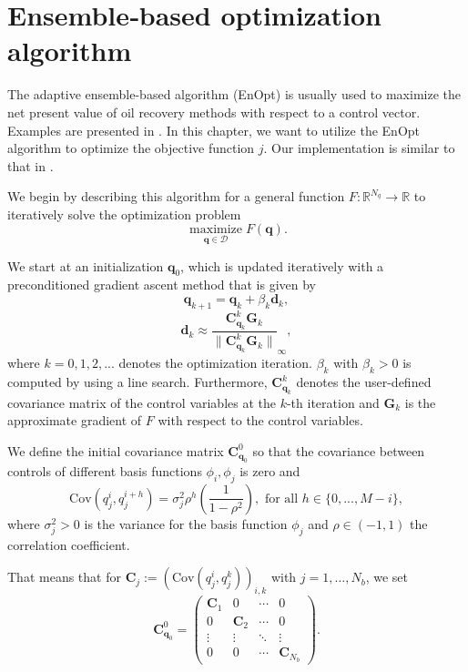 \chapter{ Ensemble‑based optimization algorithm}

The adaptive ensemble-based algorithm (EnOpt) is usually used to maximize the net present value of oil recovery methods with respect to a control vector. Examples are presented in \cite{Keil2022-dj, OGUNTOLA2021109165, Zhang2023-sg}. In this chapter, we want to utilize the EnOpt algorithm to optimize the objective function $j$. Our implementation is similar to that in \cite{Keil2022-dj}.

We begin by describing this algorithm for a general function $F:\mathbb{R}^{N_q}\to \mathbb{R}$ to iteratively solve the optimization problem
\begin{displaymath}
\operatorname*{maximize}_{\mathbf{q}\in\mathcal{D}}F(\mathbf{q}).
\end{displaymath}

We start at an initialization $\mathbf{q}_0$,  which is updated iteratively with a preconditioned gradient ascent method that is given by
\begin{displaymath}
\mathbf{q}_{k+1} = \mathbf{q}_k+\beta_k\mathbf{d}_k,
\end{displaymath}
\begin{displaymath}
\mathbf{d}_k\approx\frac{\mathbf{C}_{\mathbf{q}_k}^k\mathbf{G}_k}{\|\mathbf{C}_{\mathbf{q}_k}^k\mathbf{G}_k\|}_\infty,
\end{displaymath}
where $k=0,1,2,...$ denotes the optimization iteration. $\beta_k$ with $\beta_k>0$ is computed by using a line search. Furthermore, $\mathbf{C}_{\mathbf{q}_k}^k$ denotes the user-defined covariance matrix of the control variables at the $k$-th iteration and $\mathbf{G}_k$ is the approximate gradient of $F$ with respect to the control variables.

We define the initial covariance matrix $\mathbf{C}_{\mathbf{q}_0}^0$ so that the covariance between controls of different basis functions $\phi_i,\phi_j$ is zero and
\begin{displaymath}
\mathrm{Cov}(q_j^i,q_j^{i+h})=\sigma_j^2\rho^h\left(\frac{1}{1-\rho^2}\right),\text{ for all }h\in\{0,...,M-i\},
\end{displaymath}
where $\sigma_j^2>0$ is the variance for the basis function $\phi_j$ and $\rho\in(-1,1)$ the correlation coefficient.

That means that for $\mathbf{C}_j:=\left(\mathrm{Cov}(q_j^i,q_j^{k})\right)_{i,k}$ with $j=1,\dotsc,N_b$, we set
\begin{equation}
\label{initCov}
\mathbf{C}_{\mathbf{q}_0}^0 =
\begin{pmatrix}
  \mathbf{C}_1 & 0 & \cdots & 0 \\
  0 & \mathbf{C}_2 & \cdots & 0 \\
  \vdots  & \vdots  & \ddots & \vdots  \\
  0 & 0 & \cdots & \mathbf{C}_{N_b} 
 \end{pmatrix}.
\end{equation}

